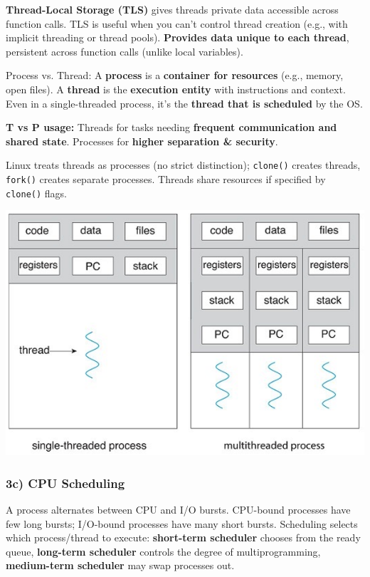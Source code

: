 \textbf{Thread-Local Storage (TLS)} gives threads private data accessible across function calls.
TLS is useful when you can't control thread creation (e.g., with implicit threading or thread pools).
\textbf{Provides data unique to each thread}, persistent across function calls (unlike local variables).


Process vs. Thread:
A \textbf{process} is a \textbf{container for resources} (e.g., memory, open files).
A \textbf{thread} is the \textbf{execution entity} with instructions and context.
Even in a single-threaded process, it's the \textbf{thread that is scheduled} by the OS.

\textbf{T vs P usage: }Threads for tasks needing \textbf{frequent communication and shared state}.
Processes for \textbf{higher separation \& security}.

Linux treats threads as processes (no strict distinction); \texttt{clone()} creates threads, \texttt{fork()} creates separate processes. Threads share resources if specified by \texttt{clone()} flags.

\includegraphics[width=0.95\linewidth]{images/03a_p14_threaded_process.png}

\subsubsection*{3c) CPU Scheduling}

A process alternates between CPU and I/O bursts. CPU-bound processes have few long bursts; I/O-bound processes have many short bursts. Scheduling selects which process/thread to execute: \textbf{short-term scheduler} chooses from the ready queue, \textbf{long-term scheduler} controls the degree of multiprogramming, \textbf{medium-term scheduler} may swap processes out.


